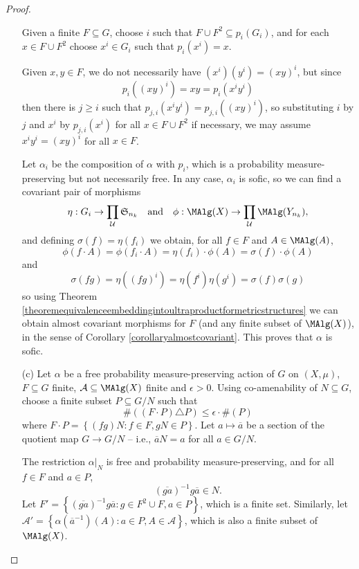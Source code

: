 \begin{proof}
\begin{enumerate}
Given a finite $F\subseteq G$, choose $i$ such that $F\cup F^2\subseteq p_i(G_i)$, and for each $x\in F\cup F^2$ choose $x^i\in G_i$ such that $p_i(x^i)=x$.

Given $x,y\in F$, we do not necessarily have $(x^i)(y^i)=(xy)^i$, but since
\[p_i((xy)^i)=xy=p_i(x^iy^i)\]
then there is $j\geq i$ such that $p_{j,i}(x^iy^i)=p_{j,i}((xy)^i)$, so substituting $i$ by $j$ and $x^i$ by $p_{j,i}(x^i)$ for all $x\in F\cup F^2$ if necessary, we may assume $x^iy^i=(xy)^i$ for all $x\in F$.

Let $\alpha_i$ be the composition of $\alpha$ with $p_i$, which is a probability measure-preserving but not necessarily free. In any case, $\alpha_i$ is sofic, so we can find a covariant pair of morphisms
\[\eta:G_i\to\prod_\mathcal{U}\mathfrak{S}_{n_k}\quad\text{and}\quad\phi:\MAlg(X)\to\prod_\mathcal{U}\MAlg(Y_{n_k}),\]
and defining $\sigma(f)=\eta(f_i)$ we obtain, for all $f\in F$ and $A\in\MAlg(A)$,
\[\phi(f\cdot A)=\phi(f_i\cdot A)=\eta(f_i)\cdot\phi(A)=\sigma(f)\cdot\phi(A)\]
and
\[\sigma(fg)=\eta((fg)^i)=\eta(f^i)\eta(g^i)=\sigma(f)\sigma(g)\]
so using Theorem \ref{theoremequivalenceembeddingintoultraproductformetricstructures} we can obtain almost covariant morphisms for $F$ (and any finite subset of $\MAlg(X)$), in the sense of Corollary \ref{corollaryalmostcovariant}. This proves that $\alpha$ is sofic.
\item[(c)] Let $\alpha$ be a free probability measure-preserving action of $G$ on $(X,\mu)$, $F\subseteq G$ finite, $\mathcal{A}\subseteq\MAlg(X)$ finite and $\epsilon>0$. Using co-amenability of $N\subseteq G$, choose a finite subset $P\subseteq G/N$ such that
\[\#((F\cdot P)\triangle P)\leq\epsilon\cdot\#(P)\]
where $F\cdot P=\left\{(fg)N:f\in F, gN\in P\right\}$. Let $a\mapsto \overline{a}$ be a section of the quotient map $G\to G/N$ -- i.e., $\overline{a}N=a$ for all $a\in G/N$.

The restriction $\alpha|_N$ is free and probability measure-preserving, and for all $f\in F$ and $a\in P$,
\[(\overline{ga})^{-1}g\overline{a}\in N.\]
Let $F'=\left\{(\overline{ga})^{-1}g\overline{a}:g\in F^2\cup F, a\in P\right\}$, which is a finite set. Similarly, let $\mathcal{A}'=\left\{\alpha(\overline{a}^{-1})(A):a\in P, A\in\mathcal{A}\right\}$, which is also a finite subset of $\MAlg(X)$.


\end{enumerate}
\end{proof}
